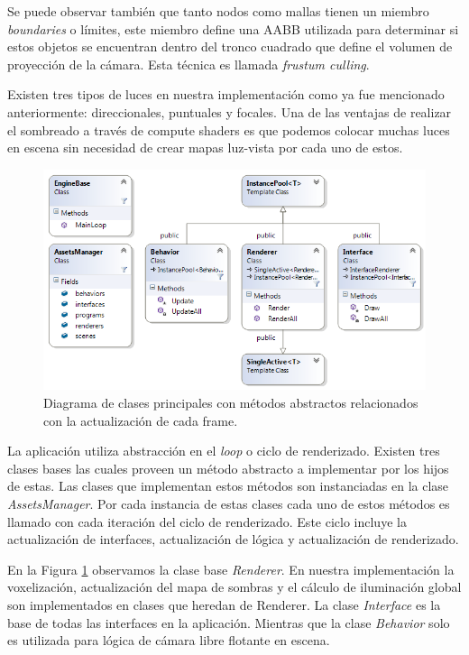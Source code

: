 Se puede observar también que tanto nodos como mallas tienen un miembro \emph{boundaries} o límites, este miembro define una \ac{AABB} utilizada para determinar si estos objetos se encuentran dentro del tronco cuadrado que define el volumen de proyección de la cámara. Esta técnica es llamada \emph{frustum culling}. 

Existen tres tipos de luces en nuestra implementación como ya fue mencionado anteriormente: direccionales, puntuales y focales. Una de las ventajas de realizar el sombreado a través de compute shaders es que podemos colocar muchas luces en escena sin necesidad de crear mapas luz-vista por cada uno de estos.

\begin{figure}[H]
	\centering
	\captionsetup{justification=centering}
	\includegraphics[width=\linewidth]{media/ClassDiagram.png}
	\caption{Diagrama de clases principales con métodos abstractos relacionados con la actualización de cada frame.}
	\label{fig:frame_classes}
\end{figure}

La aplicación utiliza abstracción en el \emph{loop} o ciclo de renderizado. Existen tres clases bases las cuales proveen un método abstracto a implementar por los hijos de estas. Las clases que implementan estos métodos son instanciadas en la clase \emph{AssetsManager}. Por cada instancia de estas clases cada uno de estos métodos es llamado con cada iteración del ciclo de renderizado. Este ciclo incluye la actualización de interfaces, actualización de lógica y actualización de renderizado.

En la Figura \ref{fig:frame_classes} observamos la clase base \emph{Renderer}. En nuestra implementación la voxelización, actualización del mapa de sombras y el cálculo de iluminación global son implementados en clases que heredan de Renderer. La clase \emph{Interface} es la base de todas las interfaces en la aplicación. Mientras que la clase \emph{Behavior} solo es utilizada para lógica de cámara libre flotante en escena.


